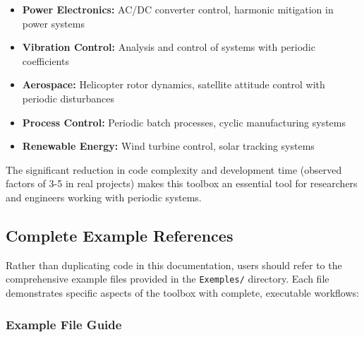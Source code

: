 \documentclass[11pt,a4paper]{article}
\begin{document}
\begin{itemize}
    \item \textbf{Power Electronics:} AC/DC converter control, harmonic mitigation in power systems
    \item \textbf{Vibration Control:} Analysis and control of systems with periodic coefficients
    \item \textbf{Aerospace:} Helicopter rotor dynamics, satellite attitude control with periodic disturbances  
    \item \textbf{Process Control:} Periodic batch processes, cyclic manufacturing systems
    \item \textbf{Renewable Energy:} Wind turbine control, solar tracking systems
\end{itemize}

The significant reduction in code complexity and development time (observed factors of 3-5 in real projects) makes this toolbox an essential tool for researchers and engineers working with periodic systems.

\subsection{Complete Example References}

Rather than duplicating code in this documentation, users should refer to the comprehensive example files provided in the \texttt{Exemples/} directory. Each file demonstrates specific aspects of the toolbox with complete, executable workflows:

\subsubsection{Example File Guide}
\end{document}
